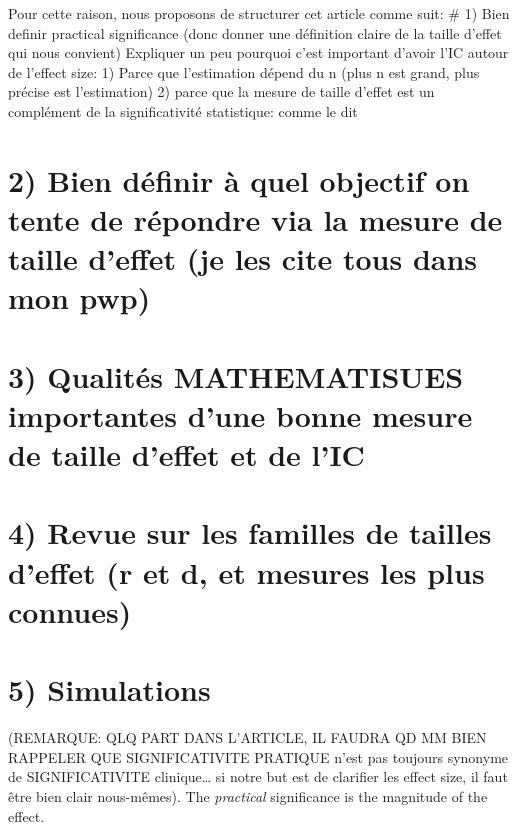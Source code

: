 \documentclass[man]{apa6}
\begin{document}
Pour cette raison, nous proposons de structurer cet article comme suit:
\# 1) Bien definir practical significance (donc donner une définition claire de la taille d'effet qui nous convient)
Expliquer un peu pourquoi c'est important d'avoir l'IC autour de l'effect size:
1) Parce que l'estimation dépend du n (plus n est grand, plus précise est l'estimation)
2) parce que la mesure de taille d'effet est un complément de la significativité statistique: comme le dit

\hypertarget{bien-duxe9finir-uxe0-quel-objectif-on-tente-de-ruxe9pondre-via-la-mesure-de-taille-deffet-je-les-cite-tous-dans-mon-pwp}{%
\section{2) Bien définir à quel objectif on tente de répondre via la mesure de taille d'effet (je les cite tous dans mon pwp)}\label{bien-duxe9finir-uxe0-quel-objectif-on-tente-de-ruxe9pondre-via-la-mesure-de-taille-deffet-je-les-cite-tous-dans-mon-pwp}}

\hypertarget{qualituxe9s-mathematisues-importantes-dune-bonne-mesure-de-taille-deffet-et-de-lic}{%
\section{3) Qualités MATHEMATISUES importantes d'une bonne mesure de taille d'effet et de l'IC}\label{qualituxe9s-mathematisues-importantes-dune-bonne-mesure-de-taille-deffet-et-de-lic}}

\hypertarget{revue-sur-les-familles-de-tailles-deffet-r-et-d-et-mesures-les-plus-connues}{%
\section{4) Revue sur les familles de tailles d'effet (r et d, et mesures les plus connues)}\label{revue-sur-les-familles-de-tailles-deffet-r-et-d-et-mesures-les-plus-connues}}

\hypertarget{simulations}{%
\section{5) Simulations}\label{simulations}}

(REMARQUE: QLQ PART DANS L'ARTICLE, IL FAUDRA QD MM BIEN RAPPELER QUE SIGNIFICATIVITE PRATIQUE n'est pas toujours synonyme de SIGNIFICATIVITE clinique\ldots{} si notre but est de clarifier les effect size, il faut être bien clair nous-mêmes). The \emph{practical} significance is the magnitude of the effect.
\end{document}
